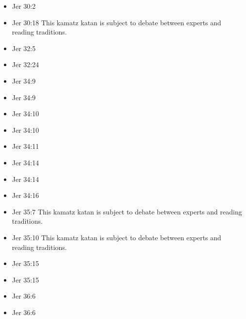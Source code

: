 \documentclass[14pt]{book}
\begin{document}
\begin{multicols}{2}
\begin{itemize}
								\item Jer 30:2
								
								
								\item Jer 30:18 This kamatz katan is subject to debate between experts and reading traditions.
								
								
								\item Jer 32:5
								
								\item Jer 32:24
								
								\item Jer 34:9
								
								\item Jer 34:9
								
								\item Jer 34:10
								
								\item Jer 34:10
								
								\item Jer 34:11
								
								\item Jer 34:14
								
								\item Jer 34:14
								
								\item Jer 34:16
								
								\item Jer 35:7 This kamatz katan is subject to debate between experts and reading traditions.
								
								\item Jer 35:10 This kamatz katan is subject to debate between experts and reading traditions.
								
								\item Jer 35:15
								
								\item Jer 35:15
								
								\item Jer 36:6
								
								\item Jer 36:6
								

\end{itemize}
\end{multicols}
\end{document}
